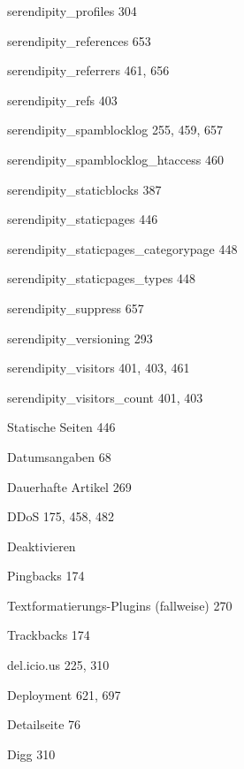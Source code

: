 \documentclass{book}
\renewcommand\subitem{\par}
\begin{document}
\begin{multicols}{2}
\begin{osp-index}
    \subitem serendipity\_profiles\hspace{1mm} 304
    \subitem serendipity\_references\hspace{1mm} 653
    \subitem serendipity\_referrers\hspace{1mm} 461, 656
    \subitem serendipity\_refs\hspace{1mm} 403
    \subitem serendipity\_spamblocklog\hspace{1mm} 255, 459, 657
    \subitem serendipity\_spamblocklog\_htaccess\hspace{1mm} 460
    \subitem serendipity\_staticblocks\hspace{1mm} 387
    \subitem serendipity\_staticpages\hspace{1mm} 446
    \subitem serendipity\_staticpages\_categorypage\hspace{1mm} 448
    \subitem serendipity\_staticpages\_types\hspace{1mm} 448
    \subitem serendipity\_suppress\hspace{1mm} 657
    \subitem serendipity\_versioning\hspace{1mm} 293
    \subitem serendipity\_visitors\hspace{1mm} 401, 403, 461
    \subitem serendipity\_visitors\_count\hspace{1mm} 401, 403
    \subitem Statische Seiten\hspace{1mm} 446
  \item Datumsangaben\hspace{1mm} 68
  \item Dauerhafte Artikel\hspace{1mm} 269
  \item DDoS\hspace{1mm} 175, 458, 482
  \item Deaktivieren
    \subitem Pingbacks\hspace{1mm} 174
    \subitem Textformatierungs-Plugins (fallweise)\hspace{1mm} 270
    \subitem Trackbacks\hspace{1mm} 174
  \item del.icio.us\hspace{1mm} 225, 310
  \item Deployment\hspace{1mm} 621, 697
  \item Detailseite\hspace{1mm} 76
  \item Digg\hspace{1mm} 310

\end{osp-index}
\end{multicols}
\end{document}
